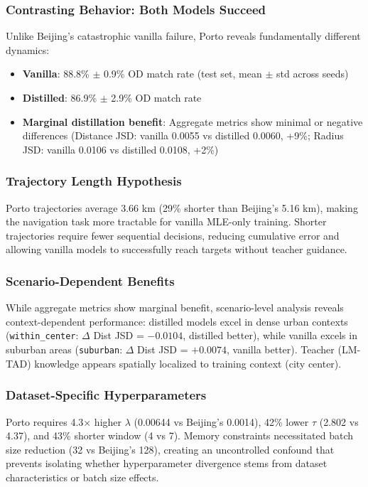 \subsubsection{Contrasting Behavior: Both Models Succeed}

Unlike Beijing's catastrophic vanilla failure, Porto reveals fundamentally different dynamics:
\begin{itemize}[leftmargin=*,noitemsep]
    \item \textbf{Vanilla}: 88.8\% $\pm$ 0.9\% OD match rate (test set, mean $\pm$ std across seeds)
    \item \textbf{Distilled}: 86.9\% $\pm$ 2.9\% OD match rate
    \item \textbf{Marginal distillation benefit}: Aggregate metrics show minimal or negative differences (Distance JSD: vanilla 0.0055 vs distilled 0.0060, +9\%; Radius JSD: vanilla 0.0106 vs distilled 0.0108, +2\%)
\end{itemize}

\subsubsection{Trajectory Length Hypothesis}

Porto trajectories average 3.66 km (29\% shorter than Beijing's 5.16 km), making the navigation task more tractable for vanilla MLE-only training. Shorter trajectories require fewer sequential decisions, reducing cumulative error and allowing vanilla models to successfully reach targets without teacher guidance.

\subsubsection{Scenario-Dependent Benefits}

While aggregate metrics show marginal benefit, scenario-level analysis reveals context-dependent performance: distilled models excel in dense urban contexts (\texttt{within\_center}: $\Delta$ Dist JSD = $-0.0104$, distilled better), while vanilla excels in suburban areas (\texttt{suburban}: $\Delta$ Dist JSD = $+0.0074$, vanilla better). Teacher (LM-TAD) knowledge appears spatially localized to training context (city center).

\subsubsection{Dataset-Specific Hyperparameters}

Porto requires 4.3$\times$ higher $\lambda$ (0.00644 vs Beijing's 0.0014), 42\% lower $\tau$ (2.802 vs 4.37), and 43\% shorter window (4 vs 7). Memory constraints necessitated batch size reduction (32 vs Beijing's 128), creating an uncontrolled confound that prevents isolating whether hyperparameter divergence stems from dataset characteristics or batch size effects.

